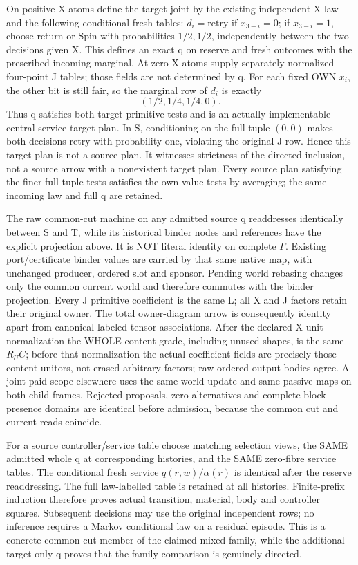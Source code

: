 \documentclass{article}\usepackage{amsmath,amssymb,amsthm}
\begin{document}
On positive X atoms define the target joint by the existing independent X law and the following conditional fresh tables: $d_i=\mathrm{retry}$ if $x_{3-i}=0$; if $x_{3-i}=1$, choose return or Spin with probabilities $1/2,1/2$, independently between the two decisions given X. This defines an exact q on reserve and fresh outcomes with the prescribed incoming marginal. At zero X atoms supply separately normalized four-point J tables; those fields are not determined by q. For each fixed OWN $x_i$, the other bit is still fair, so the marginal row of $d_i$ is exactly
\[
 (1/2,1/4,1/4,0).
\]
Thus q satisfies both target primitive tests and is an actually implementable central-service target plan. In S, conditioning on the full tuple $(0,0)$ makes both decisions retry with probability one, violating the original J row. Hence this target plan is not a source plan. It witnesses strictness of the directed inclusion, not a source arrow with a nonexistent target plan. Every source plan satisfying the finer full-tuple tests satisfies the own-value tests by averaging; the same incoming law and full q are retained.

The raw common-cut machine on any admitted source q readdresses identically between S and T, while its historical binder nodes and references have the explicit projection above. It is NOT literal identity on complete $\Gamma$. Existing port/certificate binder values are carried by that same native map, with unchanged producer, ordered slot and sponsor. Pending world rebasing changes only the common current world and therefore commutes with the binder projection. Every J primitive coefficient is the same L; all X and J factors retain their original owner. The total owner-diagram arrow is consequently identity apart from canonical labeled tensor associations. After the declared X-unit normalization the WHOLE content grade, including unused shapes, is the same $R_UC$; before that normalization the actual coefficient fields are precisely those content unitors, not erased arbitrary factors; raw ordered output bodies agree. A joint paid scope elsewhere uses the same world update and same passive maps on both child frames. Rejected proposals, zero alternatives and complete block presence domains are identical before admission, because the common cut and current reads coincide.

For a source controller/service table choose matching selection views, the SAME admitted whole q at corresponding histories, and the SAME zero-fibre service tables. The conditional fresh service $q(r,w)/\alpha(r)$ is identical after the reserve readdressing. The full law-labelled table is retained at all histories. Finite-prefix induction therefore proves actual transition, material, body and controller squares. Subsequent decisions may use the original independent rows; no inference requires a Markov conditional law on a residual episode. This is a concrete common-cut member of the claimed mixed family, while the additional target-only q proves that the family comparison is genuinely directed.
\end{document}
